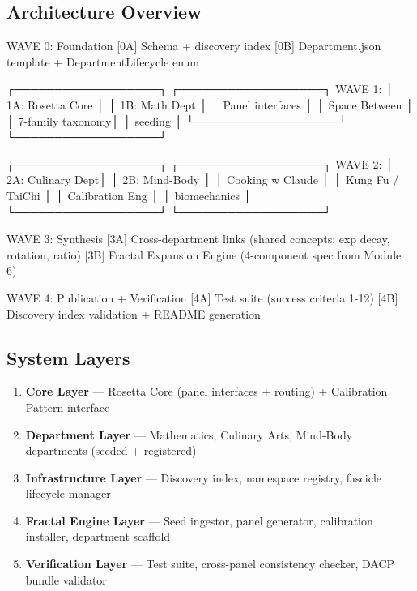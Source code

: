 \documentclass[11pt,letterpaper]{article}
\begin{document}
\subsection{Architecture Overview}

\begin{asciibox}
WAVE 0: Foundation
  [0A] Schema + discovery index
  [0B] Department.json template + DepartmentLifecycle enum

          ┌──────────────────┐    ┌──────────────────┐
WAVE 1:   │ 1A: Rosetta Core │    │ 1B: Math Dept    │
          │ Panel interfaces │    │ Space Between    │
          │ 7-family taxonomy│    │ seeding          │
          └──────────────────┘    └──────────────────┘

          ┌──────────────────┐    ┌──────────────────┐
WAVE 2:   │ 2A: Culinary Dept│    │ 2B: Mind-Body    │
          │ Cooking w Claude │    │ Kung Fu / TaiChi │
          │ Calibration Eng  │    │ biomechanics     │
          └──────────────────┘    └──────────────────┘

WAVE 3: Synthesis
  [3A] Cross-department links (shared concepts: exp decay, rotation, ratio)
  [3B] Fractal Expansion Engine (4-component spec from Module 6)

WAVE 4: Publication + Verification
  [4A] Test suite (success criteria 1-12)
  [4B] Discovery index validation + README generation
\end{asciibox}

\subsection{System Layers}

\begin{enumerate}[leftmargin=1.5em]
  \item \textbf{Core Layer} --- Rosetta Core (panel interfaces + routing) + Calibration Pattern interface
  \item \textbf{Department Layer} --- Mathematics, Culinary Arts, Mind-Body departments (seeded + registered)
  \item \textbf{Infrastructure Layer} --- Discovery index, namespace registry, fascicle lifecycle manager
  \item \textbf{Fractal Engine Layer} --- Seed ingestor, panel generator, calibration installer, department scaffold
  \item \textbf{Verification Layer} --- Test suite, cross-panel consistency checker, DACP bundle validator
\end{enumerate}
\end{document}
